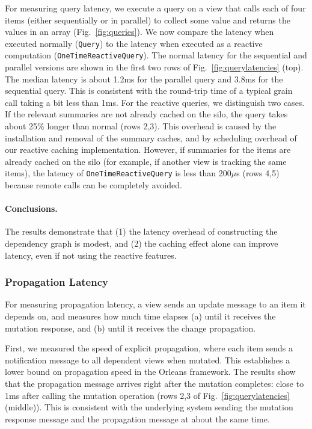 For measuring query latency, we execute a query on a view that calls each of four items (either sequentially or in parallel) to collect some value and returns the values in an array (Fig.~\ref{fig:queries}). We now compare the latency when executed normally (\lstinline|Query|) to the latency when executed as a reactive computation (\lstinline|OneTimeReactiveQuery|). The normal latency for the sequential and parallel versions are shown in the first two rows of Fig.~\ref{fig:querylatencies} (top). The median latency is about 1.2ms for the parallel query and 3.8ms for the sequential query. This is consistent with the round-trip time of a typical grain call taking a bit less than 1ms. For the reactive queries, we distinguish two cases. If  the relevant summaries are not already cached on the silo, the query takes about 25\% longer than normal (rows 2,3). This overhead is caused by the installation and removal of the summary caches, and by scheduling overhead of our reactive caching implementation. However, if summaries for the items are already cached on the silo (for example, if another view is tracking the same items), the latency of \lstinline|OneTimeReactiveQuery| is less than 200$\mu$s (rows 4,5) because remote calls can be completely avoided. 

\paragraph{Conclusions.} The results demonstrate that (1) the latency overhead of constructing the dependency graph is modest, and (2)  the caching effect alone can improve latency, even if not using the reactive features.

\subsubsection{Propagation Latency}

For measuring propagation latency, a view sends an update message to an item it depends on, and measures how much time elapses (a) until it receives the mutation response, and (b) until it receives the change propagation. 

First, we measured the speed of explicit propagation, where each item sends a notification message to all dependent views when mutated. This establishes a lower bound on propagation speed in the Orleans framework. The results show that the propagation message arrives right after the mutation completes: close to 1ms after calling the mutation operation (rows 2,3 of Fig.~\ref{fig:querylatencies} (middle)). This is consistent with the underlying system sending the mutation response message and the propagation message at about the same time. 

